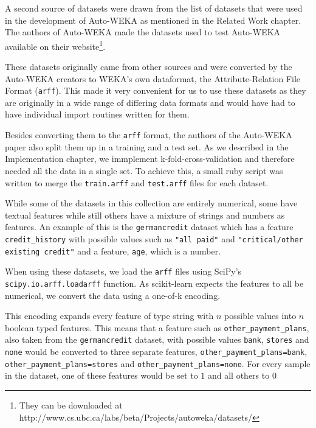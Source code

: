\documentclass[a4paper,12pt,twoside,openright]{report}
\begin{document}
A second source of datasets were drawn from the list of datasets that were used in the development of Auto-WEKA as mentioned in the Related Work chapter. The authors of Auto-WEKA made the datasets used to test Auto-WEKA available on their website\footnote{They can be downloaded at http://www.cs.ubc.ca/labs/beta/Projects/autoweka/datasets/}.

These datasets originally came from other sources \cite{Lichman:2013, Larochelle:2007:EED:1273496.1273556, Krizhevsky09learningmultiple} and were converted by the Auto-WEKA creators to WEKA's own dataformat, the Attribute-Relation File Format (\texttt{arff}). This made it very convenient for us to use these datasets as they are originally in a wide range of differing data formats and would have had to have individual import routines written for them. 

Besides converting them to the \texttt{arff} format, the authors of the Auto-WEKA paper also split them up in a training and a test set. As we described in the Implementation chapter, we immplement k-fold-cross-validation and therefore needed all the data in a single set. To achieve this, a small ruby script was written to merge the \texttt{train.arff} and \texttt{test.arff} files for each dataset.


While some of the datasets in this collection are entirely numerical, some have textual features while still others have a mixture of strings and numbers as features. An example of this is the \texttt{germancredit} dataset which has a feature \texttt{credit\_history} with possible values such as \texttt{"all paid"} and \texttt{"critical/other existing credit"} and a feature,  \texttt{age}, which is a number.

When using these datasets, we load the \texttt{arff} files using SciPy's \texttt{scipy.io.arff.loadarff} function. As scikit-learn expects the features to all be numerical, we convert the data using a one-of-k encoding.

This encoding expands every feature of type string with $n$ possible values into $n$ boolean typed features. This means that a feature such as \texttt{other\_payment\_plans}, also taken from the \texttt{germancredit} dataset, with possible values \texttt{bank}, \texttt{stores} and \texttt{none} would be converted to three separate features, \texttt{other\_payment\_plans=bank}, \texttt{other\_payment\_plans=stores} and \texttt{other\_payment\_plans=none}. For every sample in the dataset, one of these features would be set to $1$ and all others to $0$
\end{document}
